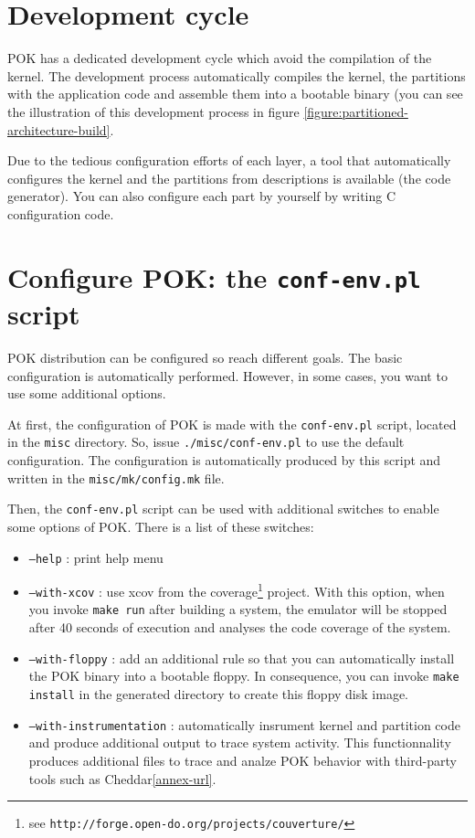    \section{Development cycle}
   POK has a dedicated development cycle which avoid the compilation of the
   kernel. The development process automatically compiles the kernel, the
   partitions with the application code and assemble them into a bootable
   binary (you can see the illustration of this development process in figure
   \ref{figure:partitioned-architecture-build}.

   Due to the tedious configuration efforts of each layer, a tool that automatically
   configures the kernel and the partitions from \aadl descriptions is available
   (the \ocarina code generator). You can
   also configure each part by yourself by writing C configuration code.

   \section{Configure POK: the \texttt{conf-env.pl} script}
   \label{pok-configuration}
   POK distribution can be configured so reach different goals. The basic
   configuration is automatically performed. However, in some cases, you want to
   use some additional options.

   At first, the configuration of POK is made with the \texttt{conf-env.pl}
   script, located in the \texttt{misc} directory. So, issue
   \texttt{./misc/conf-env.pl} to use the default configuration. The
   configuration is automatically produced by this script and written in the
   \texttt{misc/mk/config.mk} file.

   Then, the \texttt{conf-env.pl} script can be used with additional switches
   to enable some options of POK. There is a list of these switches:
   \begin{itemize}
      \item
         \texttt{--help} : print help menu
      \item
         \texttt{--with-xcov} : use xcov from the coverage\footnote{see
         \texttt{http://forge.open-do.org/projects/couverture/}} project. With
         this option, when you invoke \texttt{make run} after building a system,
         the emulator will be stopped after 40 seconds of execution and analyses
         the code coverage of the system.
      \item
         \texttt{--with-floppy} : add an additional rule so that you can
         automatically install the POK binary into a bootable floppy. In
         consequence, you can invoke \texttt{make install} in the generated
         directory to  create this floppy disk image.
      \item
         \texttt{--with-instrumentation} : automatically insrument kernel and
         partition code and produce additional output to trace system activity.
         This functionnality produces additional files to trace and analze POK
         behavior with third-party tools such as Cheddar\ref{annex-url}.
   \end{itemize}

